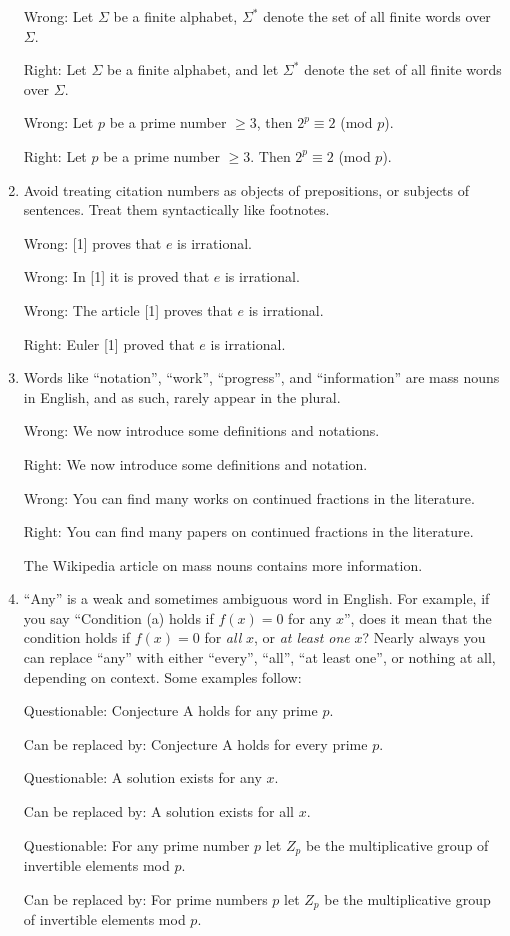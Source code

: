 \documentclass[12pt]{article}
\begin{document}
\begin{enumerate}
Wrong:  Let $\Sigma$ be a finite alphabet, $\Sigma^*$ denote the
set of all finite words over $\Sigma$.

Right:  Let $\Sigma$ be a finite alphabet, and let
$\Sigma^*$  denote the set of all finite words over $\Sigma$.

Wrong:  Let $p$ be a prime number $\geq 3$, then $2^p \equiv 2$ (mod $p$).

Right:  Let $p$ be a prime number $\geq 3$.  Then $2^p \equiv 2$ (mod $p$).

\item Avoid treating citation numbers as objects of prepositions, or
subjects of sentences.
Treat them syntactically like footnotes.

Wrong:  [1] proves that $e$ is irrational.

Wrong:  In [1] it is proved that $e$ is irrational.

Wrong:  The article [1] proves that $e$ is irrational.

Right:  Euler [1] proved that $e$ is irrational.

\item Words like ``notation'', ``work'', ``progress'',
and ``information'' are mass
nouns in English, and as such, rarely appear in the plural.

Wrong:  We now introduce some definitions and notations.

Right:  We now introduce some definitions and notation.

\bigskip

Wrong:  You can find many works on continued fractions in the literature.

Right:  You can find many papers on continued fractions in the literature.

The Wikipedia article on mass nouns contains more information.

\item ``Any'' is a weak and sometimes ambiguous word in English.  For example,
if you say ``Condition (a) holds if $f(x) = 0$ for any $x$'', does it mean
that the condition holds if $f(x) = 0$ for {\it all\/} $x$, or 
{\it at least one\/} $x$?   Nearly always you can replace ``any'' with
either ``every'', ``all'', ``at least one'', or nothing at all, depending
on context.   Some examples follow:

Questionable:  Conjecture A holds for any prime $p$.

Can be replaced by:  Conjecture A holds for every prime $p$.

Questionable:   A solution exists for any $x$.

Can be replaced by:   A solution exists for all $x$.

Questionable:  For any prime number $p$ let $Z_p$ be the multiplicative group of invertible elements mod $p$.

Can be replaced by:  For prime numbers $p$ 
let $Z_p$ be the multiplicative group of invertible elements mod $p$.



\end{enumerate}
\end{document}
